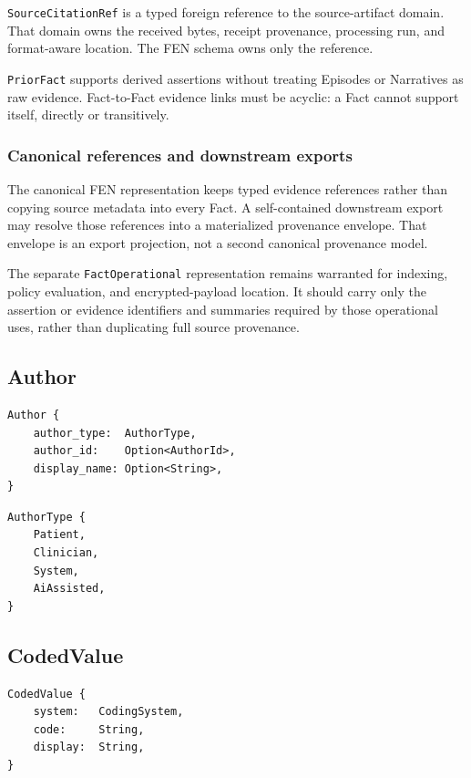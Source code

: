 \documentclass[11pt]{article}
\begin{document}
\texttt{SourceCitationRef} is a typed foreign reference to the source-artifact
domain. That domain owns the received bytes, receipt provenance, processing
run, and format-aware location. The FEN schema owns only the reference.

\texttt{PriorFact} supports derived assertions without treating Episodes or
Narratives as raw evidence. Fact-to-Fact evidence links must be acyclic: a Fact
cannot support itself, directly or transitively.

\subsubsection{Canonical references and downstream exports}

The canonical FEN representation keeps typed evidence references rather than
copying source metadata into every Fact. A self-contained downstream export
may resolve those references into a materialized provenance envelope. That
envelope is an export projection, not a second canonical provenance model.

The separate \texttt{FactOperational} representation remains warranted for
indexing, policy evaluation, and encrypted-payload location. It should carry
only the assertion or evidence identifiers and summaries required by those
operational uses, rather than duplicating full source provenance.

\subsection{Author}

\begin{lstlisting}
Author {
    author_type:  AuthorType,
    author_id:    Option<AuthorId>,
    display_name: Option<String>,
}
\end{lstlisting}

\begin{lstlisting}
AuthorType {
    Patient,
    Clinician,
    System,
    AiAssisted,
}
\end{lstlisting}

\subsection{CodedValue}

\begin{lstlisting}
CodedValue {
    system:   CodingSystem,
    code:     String,
    display:  String,
}
\end{lstlisting}
\end{document}
